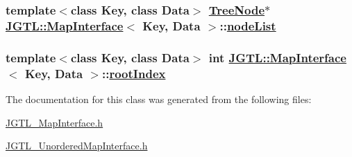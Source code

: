 \hypertarget{class_j_g_t_l_1_1_map_interface_7b271ddce20b3fc8386360ca277da4fa}{
\subsubsection[nodeList]{\setlength{\rightskip}{0pt plus 5cm}template$<$class Key, class Data$>$ \hyperlink{class_j_g_t_l_1_1_binary_tree_node}{Tree\-Node}$\ast$ \hyperlink{class_j_g_t_l_1_1_map_interface}{JGTL::Map\-Interface}$<$ Key, Data $>$::\hyperlink{class_j_g_t_l_1_1_map_interface_7b271ddce20b3fc8386360ca277da4fa}{node\-List}}}
\label{class_j_g_t_l_1_1_map_interface_7b271ddce20b3fc8386360ca277da4fa}


\hypertarget{class_j_g_t_l_1_1_map_interface_9407ca6114c7972d533f22ad1061e23b}{
\subsubsection[rootIndex]{\setlength{\rightskip}{0pt plus 5cm}template$<$class Key, class Data$>$ int \hyperlink{class_j_g_t_l_1_1_map_interface}{JGTL::Map\-Interface}$<$ Key, Data $>$::\hyperlink{class_j_g_t_l_1_1_map_interface_9407ca6114c7972d533f22ad1061e23b}{root\-Index}}}
\label{class_j_g_t_l_1_1_map_interface_9407ca6114c7972d533f22ad1061e23b}




The documentation for this class was generated from the following files:\begin{CompactItemize}
\item 
\hyperlink{_j_g_t_l___map_interface_8h}{JGTL\_\-Map\-Interface.h}\item 
\hyperlink{_j_g_t_l___unordered_map_interface_8h}{JGTL\_\-Unordered\-Map\-Interface.h}\end{CompactItemize}
